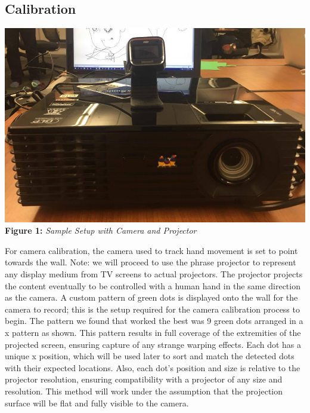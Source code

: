 \documentclass[twoside,twocolumn]{article}
\begin{document}
\subsection{Calibration}

\begin{center}
	\includegraphics[scale=0.19]{setup} \\
	\vspace{0.25cm}
	\small{\textbf{Figure 1:} \textit{Sample Setup with Camera and Projector}}
\end{center}

For camera calibration, the camera used to track hand movement is set to point towards the wall. Note: we will proceed to use the phrase projector to represent any display medium from TV screens to actual projectors. The projector projects the content eventually to be controlled with a human hand in the same direction as the camera. A custom pattern of green dots is displayed onto the wall for the camera to record; this is the setup required for the camera calibration process to begin. The pattern we found that worked the best was 9 green dots arranged in a x pattern as shown. This pattern results in full coverage of the extremities of the projected screen, ensuring capture of any strange warping effects. Each dot has a unique x position, which will be used later to sort and match the detected dots with their expected locations. Also, each dot's position and size is relative to the projector resolution, ensuring compatibility with a projector of any size and resolution. This method will work under the assumption that the projection surface will be flat and fully visible to the camera.
\end{document}
